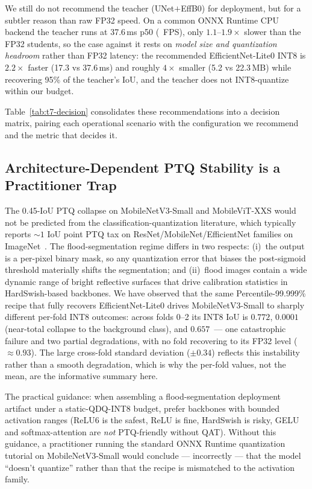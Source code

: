 We still do not recommend the teacher (UNet$+$EffB0) for deployment, but for a subtler reason than raw FP32 speed. On a common ONNX Runtime CPU backend the teacher runs at 37.6\,ms p50 (\teacherMTwoFPS~FPS), only $1.1$--$1.9\times$ slower than the FP32 students, so the case against it rests on \emph{model size and quantization headroom} rather than FP32 latency: the recommended EfficientNet-Lite0 INT8 is $2.2\times$ faster (17.3 vs 37.6\,ms) and roughly $4\times$ smaller (5.2 vs 22.3\,MB) while recovering 95\% of the teacher's IoU, and the teacher does not INT8-quantize within our budget.

Table~\ref{tab:t7-decision} consolidates these recommendations into a decision matrix, pairing each operational scenario with the configuration we recommend and the metric that decides it.



\subsection{Architecture-Dependent PTQ Stability is a Practitioner Trap}
\label{sec:discussion-ptq-trap}

The 0.45-IoU PTQ collapse on MobileNetV3-Small and MobileViT-XXS would not be predicted from the classification-quantization literature, which typically reports $\sim 1$ IoU point PTQ tax on ResNet/MobileNet/EfficientNet families on ImageNet~\cite{krishnamoorthi2018quantizing,jacob2018quantization}. The flood-segmentation regime differs in two respects: (i)~the output is a per-pixel binary mask, so any quantization error that biases the post-sigmoid threshold materially shifts the segmentation; and (ii)~flood images contain a wide dynamic range of bright reflective surfaces that drive calibration statistics in HardSwish-based backbones. We have observed that the same Percentile-99.999\% recipe that fully recovers EfficientNet-Lite0 drives MobileNetV3-Small to sharply different per-fold INT8 outcomes: across folds 0--2 its INT8 IoU is $0.772$, $0.0001$ (near-total collapse to the background class), and $0.657$~--- one catastrophic failure and two partial degradations, with no fold recovering to its FP32 level ($\approx 0.93$). The large cross-fold standard deviation ($\pm 0.34$) reflects this instability rather than a smooth degradation, which is why the per-fold values, not the mean, are the informative summary here.

The practical guidance: when assembling a flood-segmentation deployment artifact under a static-QDQ-INT8 budget, prefer backbones with bounded activation ranges (ReLU6 is the safest, ReLU is fine, HardSwish is risky, GELU and softmax-attention are \emph{not} PTQ-friendly without QAT). Without this guidance, a practitioner running the standard ONNX Runtime quantization tutorial on MobileNetV3-Small would conclude --- incorrectly --- that the model ``doesn't quantize'' rather than that the recipe is mismatched to the activation family.

